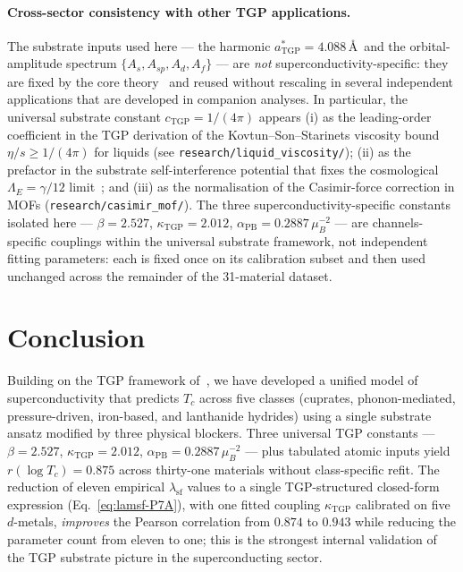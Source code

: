\documentclass[11pt,a4paper]{article}
\newcommand{\lamsf}{\lambda_{\mathrm{sf}}}
\begin{document}
\paragraph{Cross-sector consistency with other TGP applications.}
The substrate inputs used here --- the harmonic $a^{\ast}_{\mathrm{TGP}}=
4.088$\,\AA\ and the orbital-amplitude spectrum
$\{A_{s},A_{sp},A_{d},A_{f}\}$ --- are \emph{not} superconductivity-specific:
they are fixed by the core theory~\cite{TGP-core} and reused without
rescaling in several independent applications that are developed in
companion analyses. In particular, the universal substrate constant
$c_{\mathrm{TGP}}=1/(4\pi)$ appears (i) as the leading-order coefficient
in the TGP derivation of the Kovtun--Son--Starinets viscosity bound
$\eta/s \geq 1/(4\pi)$ for liquids (see
\texttt{research/liquid\_viscosity/}); (ii) as the prefactor in the
substrate self-interference potential that fixes the cosmological
$\Lambda_{E}=\gamma/12$ limit~\cite{TGP-core}; and (iii) as the
normalisation of the Casimir-force correction in MOFs
(\texttt{research/casimir\_mof/}). The three superconductivity-specific
constants isolated here --- $\beta=2.527$, $\kappa_{\mathrm{TGP}}=2.012$,
$\alpha_{\mathrm{PB}}=0.2887\,\mu_{B}^{-2}$ --- are channels-specific
couplings within the universal substrate framework, not independent
fitting parameters: each is fixed once on its calibration subset and then
used unchanged across the remainder of the 31-material dataset.

\section{Conclusion}\label{sec:conclusion}

Building on the TGP framework of~\cite{TGP-core}, we have developed a
unified model of superconductivity that predicts $T_{c}$ across
five classes (cuprates, phonon-mediated, pressure-driven, iron-based, and
lanthanide hydrides) using a single substrate ansatz modified by three
physical blockers. Three universal TGP constants ---
$\beta=2.527$, $\kappa_{\mathrm{TGP}}=2.012$,
$\alpha_{\mathrm{PB}}=0.2887\,\mu_{B}^{-2}$ --- plus tabulated atomic
inputs yield $r(\log T_{c})=0.875$ across thirty-one materials without
class-specific refit. The reduction of eleven empirical $\lamsf$ values to a single
TGP-structured closed-form expression (Eq.~\eqref{eq:lamsf-P7A}), with
one fitted coupling $\kappa_{\mathrm{TGP}}$ calibrated on five
$d$-metals, \emph{improves} the Pearson correlation from $0.874$ to
$0.943$ while reducing the parameter count from eleven to one; this is
the strongest internal validation of the TGP substrate picture in the
superconducting sector.
\end{document}

